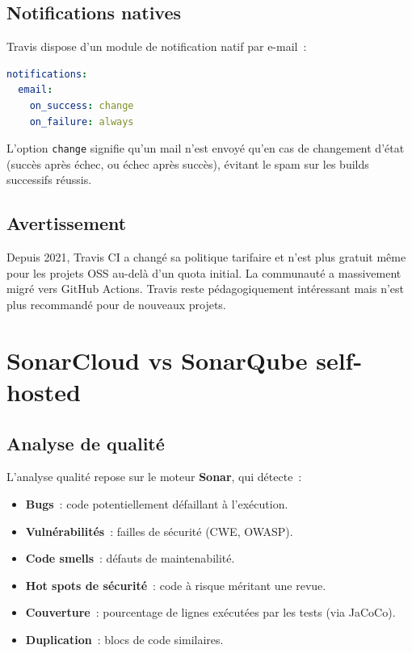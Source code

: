 \documentclass[12pt,a4paper]{report}
\begin{document}
\section{Notifications natives}

Travis dispose d'un module de notification natif par e-mail~:

\begin{lstlisting}[language=YAML, caption={Notifications email Travis}]
notifications:
  email:
    on_success: change
    on_failure: always
\end{lstlisting}

L'option \texttt{change} signifie qu'un mail n'est envoyé qu'en cas de
changement d'état (succès après échec, ou échec après succès), évitant le spam
sur les builds successifs réussis.

\section{Avertissement}

Depuis 2021, Travis CI a changé sa politique tarifaire et n'est plus gratuit
même pour les projets OSS au-delà d'un quota initial. La communauté a
massivement migré vers GitHub Actions. Travis reste pédagogiquement intéressant
mais n'est plus recommandé pour de nouveaux projets.

\chapter{SonarCloud vs SonarQube self-hosted}
\label{ch:sonar}

\section{Analyse de qualité}

L'analyse qualité repose sur le moteur \textbf{Sonar}, qui détecte~:

\begin{itemize}
  \item \textbf{Bugs}~: code potentiellement défaillant à l'exécution.
  \item \textbf{Vulnérabilités}~: failles de sécurité (CWE, OWASP).
  \item \textbf{Code smells}~: défauts de maintenabilité.
  \item \textbf{Hot spots de sécurité}~: code à risque méritant une revue.
  \item \textbf{Couverture}~: pourcentage de lignes exécutées par les tests
        (via JaCoCo).
  \item \textbf{Duplication}~: blocs de code similaires.
\end{itemize}
\end{document}
